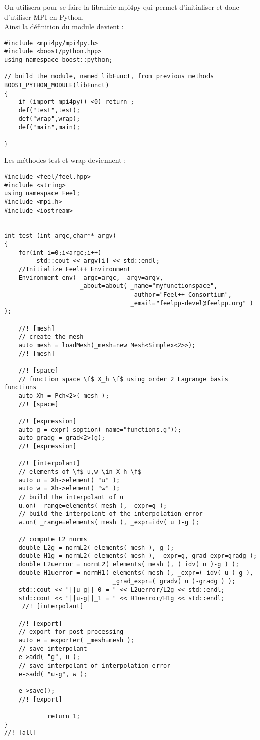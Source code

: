 \documentclass[12pt]{article}
\begin{document}
On utilisera pour se faire la librairie mpi4py qui permet d'initialiser et donc d'utiliser MPI en Python.\\

Ainsi la définition du module devient :
\begin{lstlisting}
#include <mpi4py/mpi4py.h>
#include <boost/python.hpp>
using namespace boost::python;

// build the module, named libFunct, from previous methods
BOOST_PYTHON_MODULE(libFunct)
{
    if (import_mpi4py() <0) return ;
    def("test",test); 
    def("wrap",wrap);
    def("main",main);
   
}
\end{lstlisting}

Les méthodes test et wrap deviennent  :
\begin{lstlisting}
#include <feel/feel.hpp>
#include <string>
using namespace Feel;
#include <mpi.h>
#include <iostream>


int test (int argc,char** argv)
{
    for(int i=0;i<argc;i++)
         std::cout << argv[i] << std::endl;
    //Initialize Feel++ Environment
    Environment env( _argc=argc, _argv=argv,
                     _about=about( _name="myfunctionspace",
                                   _author="Feel++ Consortium",
                                   _email="feelpp-devel@feelpp.org" )  );
    
    //! [mesh]
    // create the mesh
    auto mesh = loadMesh(_mesh=new Mesh<Simplex<2>>);
    //! [mesh]

    //! [space]
    // function space \f$ X_h \f$ using order 2 Lagrange basis functions
    auto Xh = Pch<2>( mesh );
    //! [space]

    //! [expression]
    auto g = expr( soption(_name="functions.g"));
    auto gradg = grad<2>(g);
    //! [expression]

    //! [interpolant]
    // elements of \f$ u,w \in X_h \f$
    auto u = Xh->element( "u" );
    auto w = Xh->element( "w" );
    // build the interpolant of u
    u.on( _range=elements( mesh ), _expr=g );
    // build the interpolant of the interpolation error
    w.on( _range=elements( mesh ), _expr=idv( u )-g );

    // compute L2 norms
    double L2g = normL2( elements( mesh ), g );
    double H1g = normL2( elements( mesh ), _expr=g,_grad_expr=gradg );
    double L2uerror = normL2( elements( mesh ), ( idv( u )-g ) );
    double H1uerror = normH1( elements( mesh ), _expr=( idv( u )-g ),
                              _grad_expr=( gradv( u )-gradg ) );
    std::cout << "||u-g||_0 = " << L2uerror/L2g << std::endl;
    std::cout << "||u-g||_1 = " << H1uerror/H1g << std::endl;
     //! [interpolant]

    //! [export]
    // export for post-processing
    auto e = exporter( _mesh=mesh );
    // save interpolant
    e->add( "g", u );
    // save interpolant of interpolation error
    e->add( "u-g", w );

    e->save();
    //! [export]

            return 1;  
}
//! [all]
\end{lstlisting}
\end{document}
